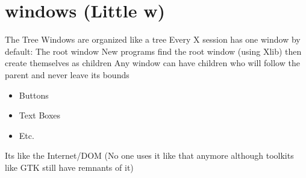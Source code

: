 \documentclass[10pt]{beamer}
\begin{document}
\section{windows (Little w)}

\begin{frame}{The Tree}
  Windows are organized like a tree
  \pause
  Every X session has one window by default: The root window
  \pause
  New programs find the root window (using Xlib) then create themselves as
  children
  \pause
  Any window can have children who will follow the parent and never leave its
  bounds
  \pause
  \begin{itemize}
    \item Buttons
    \item Text Boxes
    \item Etc.
  \end{itemize}
  \pause
  Its like the Internet/DOM
  \pause
  (No one uses it like that anymore although toolkits like GTK still have
  remnants of it)
\end{frame}
\end{document}
